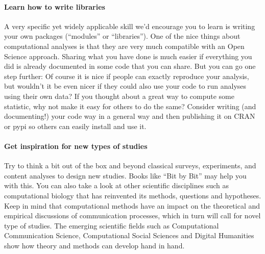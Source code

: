 \paragraph{Learn how to write libraries} A very specific yet widely applicable skill we'd encourage you to learn is writing your own packages (``modules'' or ``libraries''). One of the nice things about computational analyses is that they are very much compatible with an Open Science approach. Sharing what you have done is much easier if everything you did is already documented in some code that you can share. But you can go one step further: Of course it is nice if people can exactly reproduce your analysis, but wouldn't it be even nicer if they could also use your code to run analyses using their own data?
If you thought about a great way to compute some statistic, why not make it easy for others to do the same?
Consider writing (and documenting!) your code way in a general way and then publishing it on CRAN or pypi so others can easily install and use it.

\paragraph{Get inspiration for new types of studies} Try to think a bit out of the box and beyond classical surveys, experiments, and content analyses to design new studies. Books like ``Bit by Bit'' \cite{Salganik2019} may help you with this. You can also take a look at other scientific disciplines such as computational biology that has reinvented its methods, questions and hypotheses. Keep in mind that computational methods have an impact on the theoretical and empirical discussions of communication processes, which in turn will call for novel type of studies. The emerging scientific fields such as Computational Communication Science, Computational Social Sciences and Digital Humanities show how theory and methods can develop hand in hand.

